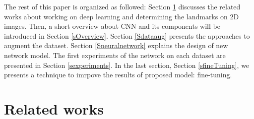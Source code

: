 \documentclass[review]{elsarticle}
\begin{document}
\fi
The rest of this paper is organized as followed: Section \ref{related_works} discusses the related works about working on deep learning and determining the landmarks on 2D images. Then, a short overview about CNN and its components will be introduced in Section \ref{sOverview}. Section \ref{Sdataaug} presents the approaches to augment the dataset. Section \ref{Sneuralnetwork} explains the design of new network model. The first experiments of the network on each dataset are presented in Section \ref{sexperiments}. In the last section, Section \ref{sfineTuning}, we presents a technique to imrpove the results of proposed model: fine-tuning.


\section{Related works}
\label{related_works}
\end{document}
